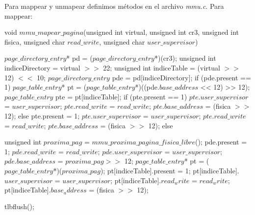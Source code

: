 Para mappear y unmapear definimos m\'etodos en el archivo \textit{mmu.c}.
Para mappear:
\begin{algorithmic}
    \State \tab void $mmu\_mapear\_pagina$(unsigned int virtual, unsigned int cr3, \State \tab unsigned int fisica, unsigned char $read\_write$, unsigned char $user\_supervisor$) {

  \State \tab \tab $page\_directory\_entry$* pd = ($page\_directory\_entry$*)(cr3);
  \State \tab \tab unsigned int indiceDirectory = virtual $>>$ 22;
  \State \tab \tab unsigned int indiceTable = (virtual $>>$ 12) $<<$ 10;
  \State \tab \tab $page\_directory\_entry$ pde = pd[indiceDirectory];
  \State \tab \tab if (pde.present == 1) {
    \State \tab \tab \tab $page\_table\_entry$* pt = ($page\_table\_entry$*)((pde.$base\_address$ << 12) >> 12);
    \State \tab \tab \tab $page\_table\_entry$ pte = pt[indiceTable];
    \State \tab \tab \tab if (pte.present == 1) {
      \State \tab \tab \tab \tab $pte.user\_supervisor$ = $user\_supervisor$;
      \State \tab \tab \tab \tab $pte.read\_write$ = $read\_write$;
      \State \tab \tab \tab \tab $pte.base\_address$ = (fisica $>>$ 12);
    \State \tab \tab \tab } else {
      \State \tab \tab \tab \tab pte.present = 1;
      \State \tab \tab \tab \tab $pte.user\_supervisor$ = $user\_supervisor$;
      \State \tab \tab \tab \tab $pte.read\_write$ = $read\_write$;
      \State \tab \tab \tab \tab $pte.base\_address$ = (fisica $>>$ 12);
    \State \tab \tab \tab }
  \State \tab \tab } else {
    \State \tab \tab \tab unsigned int $proxima\_pag$ = $mmu\_proxima\_pagina\_fisica\_libre$();
    \State \tab \tab \tab pde.present = 1;
    \State \tab \tab \tab $pde.read\_write$ = $read\_write$;
    \State \tab \tab \tab $pde.user\_supervisor$ = $user\_supervisor$;
    \State \tab \tab \tab $pde.base\_address$ = $proxima\_pag >>$ 12;
    \State \tab \tab \tab $page\_table\_entry$* pt = ($page\_table\_entry$*)($proxima\_pag$);
    \State \tab \tab \tab pt[indiceTable].present = 1;
    \State \tab \tab \tab pt[indiceTable].$user\_supervisor$ = $user\_supervisor$;
    \State \tab \tab \tab pt[indiceTable].$read_write$ = $read_write$;
    \State \tab \tab \tab pt[indiceTable].$base_address$ = (fisica $>>$ 12);

\State \tab \tab  }

  \State \tab \tab tlbflush();
\State \tab }



\end{algorithmic}

